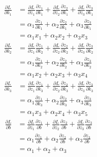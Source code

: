 \documentclass[11pt]{scrartcl} %
\begin{document}
\subsection{} %
\begin{equation}
	\begin{aligned}
	\frac{\partial L}{\partial k_1} &= \frac{\partial L}{\partial z_1} \frac{\partial z_1}{\partial k_1} + \frac{\partial L}{\partial z_2} \frac{\partial z_2}{\partial k_1} + \frac{\partial L}{\partial z_3} \frac{\partial z_3}{\partial k_1} \\
	&= \alpha_1 \frac{\partial z_1}{\partial k_1} + \alpha_2 \frac{\partial z_2}{\partial k_1} + \alpha_3 \frac{\partial z_3}{\partial k_1} \\
	&= \alpha_1 x_1 + \alpha_2 x_2 + \alpha_3 x_3 
	\end{aligned}
\end{equation}
\begin{equation}
	\begin{aligned}
	\frac{\partial L}{\partial k_2} &= \frac{\partial L}{\partial z_1} \frac{\partial z_1}{\partial k_2} + \frac{\partial L}{\partial z_2} \frac{\partial z_2}{\partial k_2} + \frac{\partial L}{\partial z_3} \frac{\partial z_3}{\partial k_2} \\
	&= \alpha_1 \frac{\partial z_1}{\partial k_2} + \alpha_2 \frac{\partial z_2}{\partial k_2} + \alpha_3 \frac{\partial z_3}{\partial k_2} \\
	&= \alpha_1 x_2 + \alpha_2 x_3 + \alpha_3 x_4 
	\end{aligned}
\end{equation}
\begin{equation}
	\begin{aligned}
	\frac{\partial L}{\partial k_3} &= \frac{\partial L}{\partial z_1} \frac{\partial z_1}{\partial k_3} + \frac{\partial L}{\partial z_2} \frac{\partial z_2}{\partial k_3} + \frac{\partial L}{\partial z_3} \frac{\partial z_3}{\partial k_3} \\
	&= \alpha_1 \frac{\partial z_1}{\partial k_3} + \alpha_2 \frac{\partial z_2}{\partial k_3} + \alpha_3 \frac{\partial z_3}{\partial k_3} \\
	&= \alpha_1 x_3 + \alpha_2 x_4 + \alpha_3 x_5 
	\end{aligned}
\end{equation}
\begin{equation}
	\begin{aligned}
	\frac{\partial L}{\partial b} &= \frac{\partial L}{\partial z_1} \frac{\partial z_1}{\partial b} + \frac{\partial L}{\partial z_2} \frac{\partial z_2}{\partial b} + \frac{\partial L}{\partial z_3} \frac{\partial z_3}{\partial b} \\
	&= \alpha_1 \frac{\partial z_1}{\partial b} + \alpha_2 \frac{\partial z_2}{\partial b} + \alpha_3 \frac{\partial z_3}{\partial b} \\
	&= \alpha_1 + \alpha_2 + \alpha_3
	\end{aligned}
\end{equation}
\end{document}
